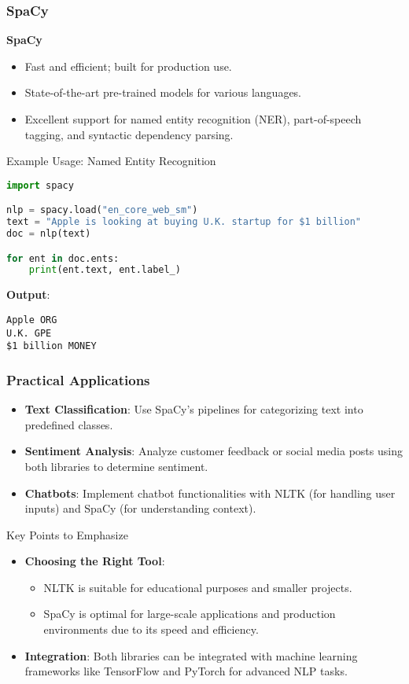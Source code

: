 \documentclass[aspectratio=169]{beamer}
\begin{document}
\begin{frame}[fragile]
    \frametitle{SpaCy}
    \textbf{SpaCy}
    \begin{itemize}
        \item Fast and efficient; built for production use.
        \item State-of-the-art pre-trained models for various languages.
        \item Excellent support for named entity recognition (NER), part-of-speech tagging, and syntactic dependency parsing.
    \end{itemize}
    \begin{block}{Example Usage: Named Entity Recognition}
        \begin{lstlisting}[language=Python]
import spacy

nlp = spacy.load("en_core_web_sm")
text = "Apple is looking at buying U.K. startup for $1 billion"
doc = nlp(text)

for ent in doc.ents:
    print(ent.text, ent.label_)
        \end{lstlisting}
        \textbf{Output}:
        \begin{verbatim}
Apple ORG
U.K. GPE
$1 billion MONEY
        \end{verbatim}
    \end{block}
\end{frame}

\begin{frame}[fragile]
    \frametitle{Practical Applications}
    \begin{itemize}
        \item \textbf{Text Classification}: Use SpaCy's pipelines for categorizing text into predefined classes.
        \item \textbf{Sentiment Analysis}: Analyze customer feedback or social media posts using both libraries to determine sentiment.
        \item \textbf{Chatbots}: Implement chatbot functionalities with NLTK (for handling user inputs) and SpaCy (for understanding context).
    \end{itemize}
    \begin{block}{Key Points to Emphasize}
        \begin{itemize}
            \item \textbf{Choosing the Right Tool}:
                \begin{itemize}
                    \item NLTK is suitable for educational purposes and smaller projects.
                    \item SpaCy is optimal for large-scale applications and production environments due to its speed and efficiency.
                \end{itemize}
            \item \textbf{Integration}: Both libraries can be integrated with machine learning frameworks like TensorFlow and PyTorch for advanced NLP tasks.
        \end{itemize}
    \end{block}
\end{frame}
\end{document}
